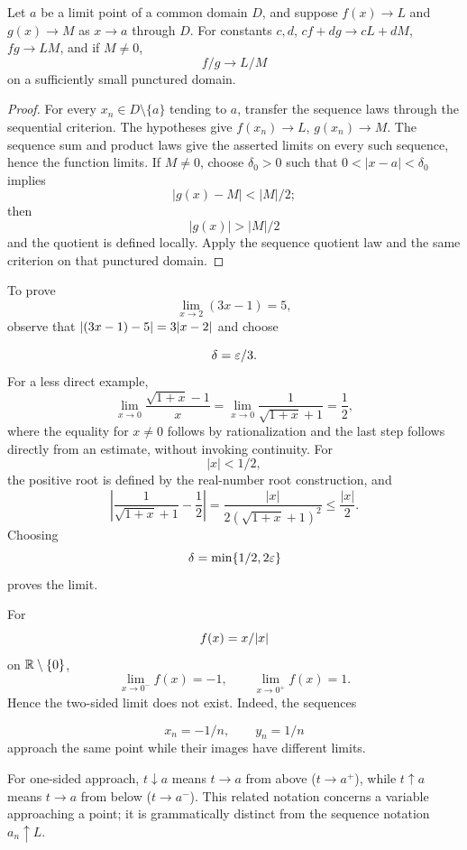 \begin{theorem}
Let $a$ be a limit point of a common domain $D$, and suppose
$f(x)\to L$ and $g(x)\to M$ as $x\to a$ through $D$.
For constants $c,d$, $cf+dg\to cL+dM$, $fg\to LM$, and if
$M\ne0$,
\[
f/g\to L/M
\]
 on a sufficiently small punctured domain.
\end{theorem}
\begin{proof}
For every $x_n\in D\setminus\{a\}$ tending to $a$, transfer the sequence
laws through the sequential criterion. The hypotheses give
$f(x_n)\to L$, $g(x_n)\to M$. The sequence sum
and product laws give the asserted limits on every such sequence, hence
the function limits. If $M\ne0$, choose $\delta_0>0$ such that
$0<|x-a|<\delta_0$ implies
\[
|g(x)-M|<|M|/2;
\]
 then
\[
|g(x)|>|M|/2
\]
 and the quotient is defined locally. Apply the
sequence quotient law and the same criterion on that punctured domain.
\end{proof}
\begin{example}
To prove
\[
\lim_{x\to2}(3x-1)=5,
\]
observe that $\lvert (3x-1)-5\rvert=3\lvert x-2\rvert$ and choose

\[
\delta=\varepsilon/3.
\]
  For a less direct example,
\[
\lim_{x\to0}\frac{\sqrt{1+x}-1}{x}
=\lim_{x\to0}\frac1{\sqrt{1+x}+1}=\frac12,
\]
where the equality for $x\ne0$ follows by rationalization and the last
step follows directly from an estimate, without invoking continuity.
For
\[
|x|<1/2,
\]
 the positive root is defined by the real-number root
construction, and
\[
\left|\frac1{\sqrt{1+x}+1}-\frac12\right|
=\frac{|x|}{2(\sqrt{1+x}+1)^2}\leq\frac{|x|}{2}.
\]
Choosing
\[
\delta=\min\{1/2,2\varepsilon\}
\]
 proves the limit.
\end{example}

\begin{example}
For
\[
f(x)=x/\lvert x\rvert
\]
 on $\mathbb{R}\setminus\{0\}$,
\[
\lim_{x\to0^-}f(x)=-1,
\qquad
\lim_{x\to0^+}f(x)=1.
\]
Hence the two-sided limit does not exist.  Indeed, the sequences

\[
x_n=-1/n,\qquad y_n=1/n
\]
 approach the same point while their images have
different limits.
\end{example}

For one-sided approach, $t\downarrow a$ means $t\to a$ from above
($t\to a^+$), while $t\uparrow a$ means $t\to a$ from below
($t\to a^-$). This related notation concerns a variable approaching a point;
it is grammatically distinct from the sequence notation $a_n\uparrow L$.

